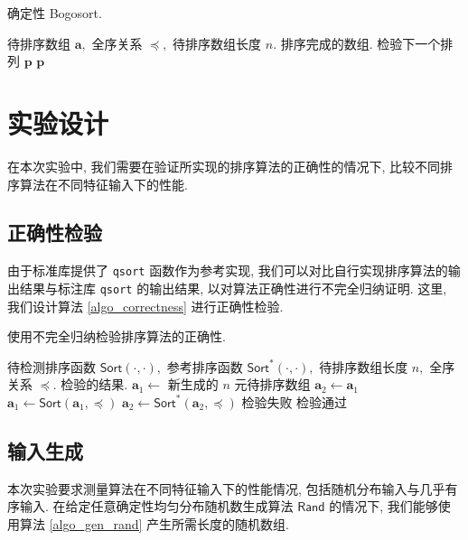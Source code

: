 \documentclass[12pt]{article}
\begin{document}
\begin{algorithm}[H]
\caption{确定性 Bogosort.}
\label{algo_bogosort_determ}
\begin{algorithmic}[1]
\Require 待排序数组 $\bm{a},$ 全序关系 $\preceq,$ 待排序数组长度 $n.$
\Ensure 排序完成的数组.
            \State 检验下一个排列 $\bm{p}$
        \EndIf
    \EndFor
    \State \Return $\bm{p}$
\EndFor
\end{algorithmic}
\end{algorithm}

\section{实验设计}

在本次实验中, 我们需要在验证所实现的排序算法的正确性的情况下, 比较不同排序算法在不同特征输入下的性能.

\subsection{正确性检验}

由于标准库提供了 \texttt{qsort} 函数作为参考实现, 我们可以对比自行实现排序算法的输出结果与标注库 \texttt{qsort} 的输出结果, 以对算法正确性进行不完全归纳证明. 这里, 我们设计算法 \ref{algo_correctness} 进行正确性检验.

\begin{algorithm}[H]
\caption{使用不完全归纳检验排序算法的正确性.}
\label{algo_correctness}
\begin{algorithmic}[1]
\Require 待检测排序函数 $\mathsf{Sort}(\cdot, \cdot),$ 参考排序函数 $\mathsf{Sort}^*(\cdot, \cdot),$ 待排序数组长度 $n,$ 全序关系 $\preceq.$
\Ensure 检验的结果.
\State $\bm{a}_1 \gets$ 新生成的 $n$ 元待排序数组
\State $\bm{a}_2 \gets \bm{a}_1$
\State $\bm{a}_1 \gets \mathsf{Sort}(\bm{a}_1, \preceq)$
\State $\bm{a}_2 \gets \mathsf{Sort}^*(\bm{a}_2, \preceq)$
       \State \Return 检验失败
    \EndIf
\EndFor
\State \Return 检验通过
\end{algorithmic}
\end{algorithm}

\subsection{输入生成}

本次实验要求测量算法在不同特征输入下的性能情况, 包括随机分布输入与几乎有序输入. 在给定任意确定性均匀分布随机数生成算法 $\mathsf{Rand}$ 的情况下, 我们能够使用算法 \ref{algo_gen_rand} 产生所需长度的随机数组.
\end{document}
